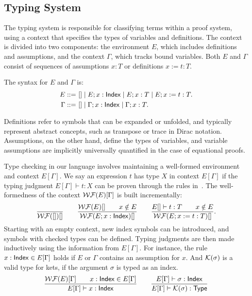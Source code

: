\subsection{Typing System}


The typing system is responsible for classifying terms within a proof system, using a context that specifies the types of variables and definitions. The context is divided into two components: the environment \( E \), which includes definitions and assumptions, and the context \( \Gamma \), which tracks bound variables. Both \( E \) and \( \Gamma \) consist of sequences of assumptions \( x : T \) or definitions \( x := t : T \).
\begin{definition}
    The syntax for \( E \) and \( \Gamma \) is:
    \begin{align*}
        E ::= &\ [] \mid E; x : \mathsf{Index} \mid E; x : T \mid E; x := t : T. \\
        \Gamma ::= &\ [] \mid \Gamma; x : \mathsf{Index} \mid \Gamma; x : T.
    \end{align*}
\end{definition}
Definitions refer to symbols that can be expanded or unfolded, and typically represent abstract concepts, such as transpose or trace in Dirac notation. Assumptions, on the other hand, define the types of variables, and variable assumptions are implicitly universally quantified in the case of equational proofs.

Type checking in our language involves maintaining a well-formed environment and context \( E[\Gamma] \). We say an expression \( t \) has type \( X \) in context \( E[\Gamma] \) if the typing judgment \( E[\Gamma] \vdash t : X \) can be proven through the rules in~. The well-formedness of the context \( \mathcal{WF}(E)[\Gamma] \) is built incrementally:
\[
    \frac{}{\mathcal{WF}([])[]}
    \qquad
    \frac{\mathcal{WF}(E)[] \qquad x \notin E}{\mathcal{WF}(E; x : \mathsf{Index})[]}
    \qquad
    \frac{E[]\vdash t:T \qquad x \notin E}{\mathcal{WF}(E; x := t:T)[]}.
\]
Starting with an empty context, new index symbols can be introduced, and symbols with checked types can be defined. Typing judgments are then made inductively using the information from \( E[\Gamma] \). For instance, the rule \( x : \mathsf{Index} \in E[\Gamma] \) holds if \( E \) or \( \Gamma \) contains an assumption for \( x \).
And \(\mathcal{K}(\sigma)\) is a valid type for kets, if the argument $\sigma$ is typed as an index.
\begin{gather*}
    \frac{\mathcal{WF}(E)[\Gamma] \qquad x : \mathsf{Index} \in E[\Gamma]}{E[\Gamma] \vdash x : \mathsf{Index}}
    \qquad
    \frac{E[\Gamma] \vdash \sigma : \mathsf{Index}}{E[\Gamma] \vdash \mathcal{K}(\sigma) : \mathsf{Type}}
\end{gather*}

